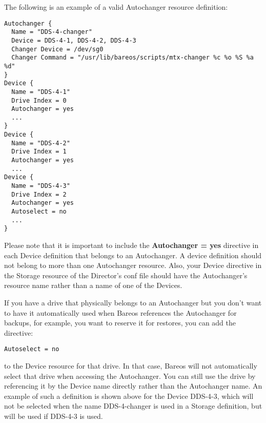 The following is an example of a valid Autochanger resource definition:

\footnotesize
\begin{verbatim}
Autochanger {
  Name = "DDS-4-changer"
  Device = DDS-4-1, DDS-4-2, DDS-4-3
  Changer Device = /dev/sg0
  Changer Command = "/usr/lib/bareos/scripts/mtx-changer %c %o %S %a %d"
}
Device {
  Name = "DDS-4-1"
  Drive Index = 0
  Autochanger = yes
  ...
}
Device {
  Name = "DDS-4-2"
  Drive Index = 1
  Autochanger = yes
  ...
Device {
  Name = "DDS-4-3"
  Drive Index = 2
  Autochanger = yes
  Autoselect = no
  ...
}
\end{verbatim}
\normalsize

Please note that it is important to include the {\bf Autochanger = yes} directive
in each Device definition that belongs to an Autochanger.  A device definition
should not belong to more than one Autochanger resource.  Also, your Device
directive in the Storage resource of the Director's conf file should have
the Autochanger's resource name rather than a name of one of the Devices.

If you have a drive that physically belongs to an Autochanger but you don't want
to have it automatically used when Bareos references the Autochanger for backups,
for example, you want to reserve it for restores, you can add the directive:

\footnotesize
\begin{verbatim}
Autoselect = no
\end{verbatim}
\normalsize

to the Device resource for that drive. In that case, Bareos will not automatically
select that drive when accessing the Autochanger. You can still use the drive
by referencing it by the Device name directly rather than the Autochanger name. An example
of such a definition is shown above for the Device DDS-4-3, which will not be
selected when the name DDS-4-changer is used in a Storage definition, but will
be used if DDS-4-3 is used.

